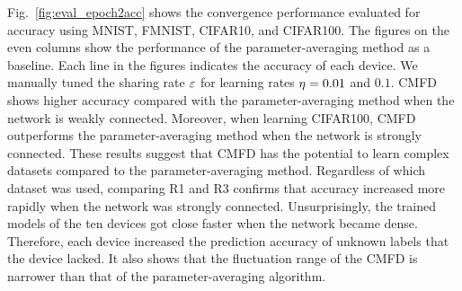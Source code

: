 \documentclass[journal]{IEEEtran}
\begin{document}
Fig.~\ref{fig:eval_epoch2acc} shows the convergence performance evaluated for accuracy using MNIST, \gls{FMNIST}, CIFAR10, and CIFAR100.
The figures on the even columns show the performance of the parameter-averaging method as a baseline.
Each line in the figures indicates the accuracy of each device.
We manually tuned the sharing rate $\varepsilon$ for learning rates $\eta=0.01$ and $0.1$.
\Gls{CMFD} shows higher accuracy compared with the parameter-averaging method when the network is weakly connected.
Moreover, when learning CIFAR100, \gls{CMFD} outperforms the parameter-averaging method when the network is strongly connected.
These results suggest that \gls{CMFD} has the potential to learn complex datasets compared to the parameter-averaging method.
Regardless of which dataset was used,
comparing R1 and R3 confirms that
accuracy increased more rapidly when the network was strongly connected.
Unsurprisingly, the trained models of the ten devices got close faster when the network became dense.
Therefore, each device increased the prediction accuracy of unknown labels that the device lacked.
It also shows that the fluctuation range of the \gls{CMFD} is narrower than that of the parameter-averaging algorithm.
\end{document}
